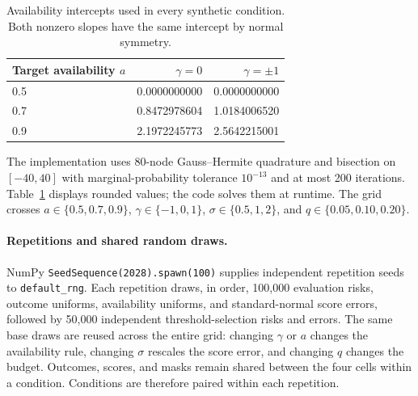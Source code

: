 \documentclass{article}
\begin{document}
\begin{table}[htbp]
  \centering
  \caption{Availability intercepts used in every synthetic condition.
  Both nonzero slopes have the same intercept by normal symmetry.}
  \label{tab:synthetic_intercepts}
  \small
  \begin{tabular}{lrr}
    \toprule
    Target availability $a$ & $\gamma=0$ & $\gamma=\pm1$ \\
    \midrule
    0.5 & 0.0000000000 & 0.0000000000 \\
    0.7 & 0.8472978604 & 1.0184006520 \\
    0.9 & 2.1972245773 & 2.5642215001 \\
    \bottomrule
  \end{tabular}
\end{table}

The implementation uses 80-node Gauss--Hermite quadrature and bisection on
$[-40,40]$ with marginal-probability tolerance $10^{-13}$ and at most 200
iterations. Table~\ref{tab:synthetic_intercepts} displays rounded values;
the code solves them at runtime. The grid crosses
$a\in\{0.5,0.7,0.9\}$, $\gamma\in\{-1,0,1\}$,
$\sigma\in\{0.5,1,2\}$, and $q\in\{0.05,0.10,0.20\}$.

\paragraph{Repetitions and shared random draws.}
NumPy \texttt{SeedSequence(2028).spawn(100)} supplies independent repetition
seeds to \texttt{default\_rng}. Each repetition draws, in order, 100,000
evaluation risks, outcome uniforms, availability uniforms, and standard-normal
score errors, followed by 50,000 independent threshold-selection risks and
errors. The same base draws are reused across the entire grid: changing
$\gamma$ or $a$ changes the availability rule, changing $\sigma$ rescales the
score error, and changing $q$ changes the budget. Outcomes, scores, and masks
remain shared between the four cells within a condition. Conditions are
therefore paired within each repetition.
\end{document}
